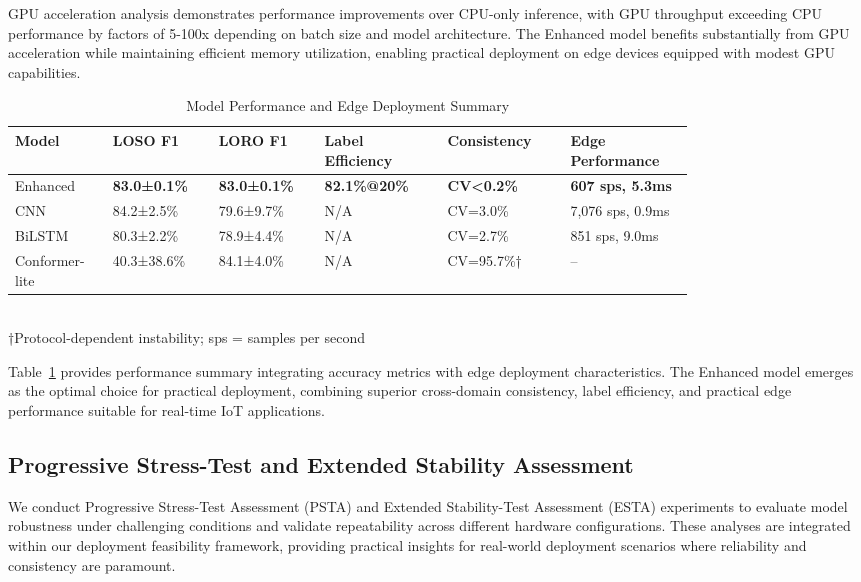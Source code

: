 \documentclass[journal]{IEEEtran}
\begin{document}
GPU acceleration analysis demonstrates performance improvements over CPU-only inference, with GPU throughput exceeding CPU performance by factors of 5-100x depending on batch size and model architecture. The Enhanced model benefits substantially from GPU acceleration while maintaining efficient memory utilization, enabling practical deployment on edge devices equipped with modest GPU capabilities.

\begin{table}[ht]
\centering
\caption{Model Performance and Edge Deployment Summary}
\begin{tabular}{p{0.10\linewidth} p{0.12\linewidth} p{0.12\linewidth} p{0.15\linewidth} p{0.15\linewidth} p{0.15\linewidth}}
\toprule
\textbf{Model} & \textbf{LOSO F1} & \textbf{LORO F1} & \textbf{Label Efficiency} & \textbf{Consistency} & \textbf{Edge Performance} \\
\midrule
Enhanced & \textbf{83.0±0.1\%} & \textbf{83.0±0.1\%} & \textbf{82.1\%@20\%} & \textbf{CV<0.2\%} & \textbf{607 sps, 5.3ms} \\
CNN & 84.2±2.5\% & 79.6±9.7\% & N/A & CV=3.0\% & 7,076 sps, 0.9ms \\
BiLSTM & 80.3±2.2\% & 78.9±4.4\% & N/A & CV=2.7\% & 851 sps, 9.0ms \\
Conformer-lite & 40.3±38.6\% & 84.1±4.0\% & N/A & CV=95.7\%† & -- \\
\bottomrule
\end{tabular}\\
\footnotesize{†Protocol-dependent instability; sps = samples per second}
\label{tab:comprehensive_performance}
\end{table}

Table~\ref{tab:comprehensive_performance} provides performance summary integrating accuracy metrics with edge deployment characteristics. The Enhanced model emerges as the optimal choice for practical deployment, combining superior cross-domain consistency, label efficiency, and practical edge performance suitable for real-time IoT applications.

\subsection{Progressive Stress-Test and Extended Stability Assessment}

We conduct Progressive Stress-Test Assessment (PSTA) and Extended Stability-Test Assessment (ESTA) experiments to evaluate model robustness under challenging conditions and validate repeatability across different hardware configurations. These analyses are integrated within our deployment feasibility framework, providing practical insights for real-world deployment scenarios where reliability and consistency are paramount.
\end{document}
